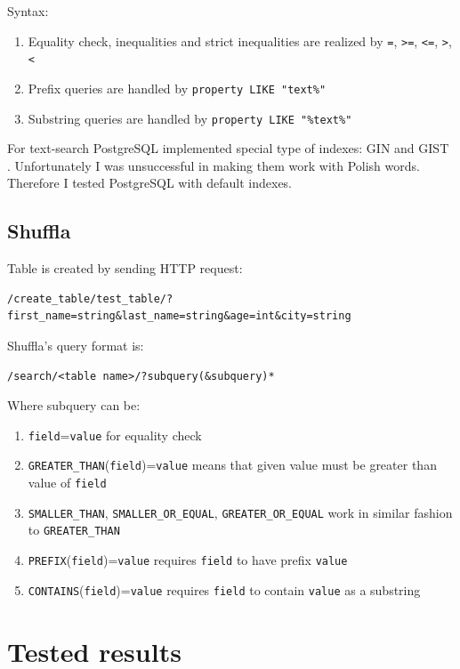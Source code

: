 \documentclass[10pt,a4paper]{article}
\begin{document}
Syntax:
\begin{enumerate}
\item Equality check, inequalities and strict inequalities are realized by \verb|=|, \verb|>=|, \verb|<=|, \verb|>|, \verb|<|
\item Prefix queries are handled by \verb|property LIKE "text%"|
\item Substring queries are handled by \verb|property LIKE "%text%"|
\end{enumerate}

For text-search PostgreSQL implemented special type of indexes: GIN \cite{PSQLGIN} and GIST \cite{PSQLGIST}. Unfortunately I was unsuccessful in making them work with Polish words. Therefore I tested PostgreSQL with default indexes.

\subsection{Shuffla}

Table is created by sending HTTP request:
\begin{verbatim}
/create_table/test_table/?first_name=string&last_name=string&age=int&city=string
\end{verbatim}
Shuffla's query format is:

\begin{verbatim}
/search/<table name>/?subquery(&subquery)*
\end{verbatim}
Where subquery can be:
\begin{enumerate}
\item \verb|field|=\verb|value| for equality check
\item \verb|GREATER_THAN|(\verb|field|)=\verb|value| means that given value must be greater than value of \verb|field| 
\item \verb|SMALLER_THAN|, \verb|SMALLER_OR_EQUAL|, \verb|GREATER_OR_EQUAL| work in similar fashion to \verb|GREATER_THAN|
\item \verb|PREFIX|(\verb|field|)=\verb|value| requires \verb|field| to have prefix \verb|value|
\item \verb|CONTAINS|(\verb|field|)=\verb|value| requires \verb|field| to contain \verb|value| as a substring
\end{enumerate}

\section{Tested results}
\end{document}
